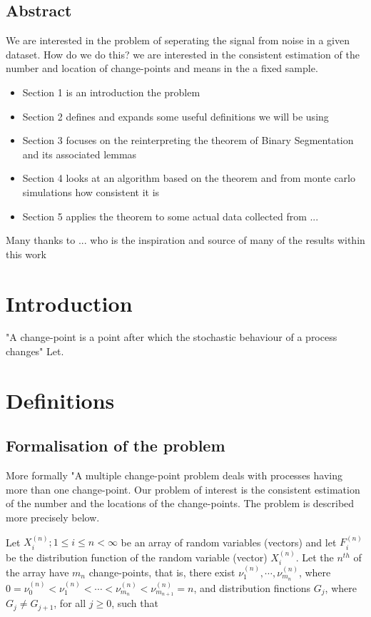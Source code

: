 \documentclass[a4paper, 12pt, notitlepage]{report}
\begin{document}
\section*{Abstract}
We are interested in the problem of seperating the signal from noise in a given dataset. How do we do this?
we are interested in the consistent estimation of the number and location of change-points and means in the a fixed sample.
\begin{itemize}
\item[] Section 1 is an introduction the problem
\item[] Section 2 defines and expands some useful definitions we will be using 
\item[] Section 3 focuses on the reinterpreting the theorem of Binary Segmentation and its associated lemmas 
\item[] Section 4  looks at an algorithm based on the theorem and from monte carlo simulations how consistent it is 
\item[] Section 5 applies the theorem to some actual data collected from ... 
\end{itemize}
Many thanks to ... who is the inspiration and source of many of the results within this work %


\tableofcontents 


\chapter{Introduction}
%
"A change-point is a point after which the stochastic behaviour of a process changes" 
 Let.

\chapter{Definitions}
%

\section{Formalisation of the problem }

More formally "A multiple change-point problem deals with processes having more than one change-point. Our problem of interest is the consistent estimation of the number and the locations of the change-points. The problem is described more precisely below. 

Let \( {X_i ^{(n)} ;1 \leq i \leq n < \infty} \) be an array of random variables (vectors) and let $F^{(n)}_i$ be the distribution function of the random variable (vector) $X^{(n)}_i$. Let the $n^{th}$ of the array have $m_n$ change-points, that is, there exist \( \nu^{(n)}_1, \cdots, \nu^{(n)}_{m_n} \), where  \(0 =  \nu^{(n)}_0 <  \nu^{(n)}_1 < \cdots < \nu^{(n)}_{m_n} < \nu^{(n)}_{m_{n+1}} = n\), and distribution finctions $G_j$, where \( G_j  \neq G_{j+1}\), for all $j \geq 0$, such that
\end{document}
